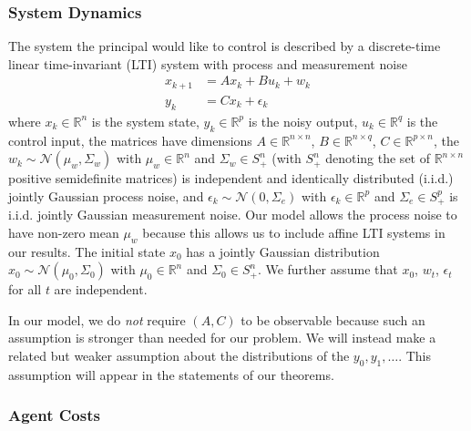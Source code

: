 \documentclass[letterpaper, 10 pt, conference]{ieeeconf}  %
\begin{document}
\subsubsection{System Dynamics}
The system the principal would like to control is described by a discrete-time linear time-invariant (LTI) system with process and measurement noise
\begin{align}
    x_{k+1}&=Ax_{k}+Bu_{k}+w_{k}\\
    y_k &= Cx_k + \epsilon_k
\end{align}
where $x_{k} \in \mathbb{R}^{n}$ is the system state, $y_k \in \mathbb{R}^p$ is the noisy output,  $u_k \in \mathbb{R}^q$ is the control input, the matrices have dimensions $A\in\mathbb{R}^{n\times n}$,  $B\in\mathbb{R}^{n\times q}$, $C\in\mathbb{R}^{p\times n}$, the $w_{k} \sim \mathcal{N}(\mu_{w}, \Sigma_{w})$ with $\mu_w \in \mathbb{R}^n$ and $\Sigma_w \in S^n_+$ (with $S^n_+$ denoting the set of $\mathbb{R}^{n\times n}$ positive semidefinite matrices) is independent and identically distributed (i.i.d.) jointly Gaussian process noise, and $\epsilon_{k} \sim \mathcal{N}(0, \Sigma_{e})$ with $\epsilon_k\in\mathbb{R}^p$ and $\Sigma_e \in S^p_+$ is i.i.d. jointly Gaussian measurement noise. Our model allows the process noise to have non-zero mean $\mu_w$ because this allows us to include affine LTI systems in our results. The initial state $x_0$ has a jointly Gaussian distribution $x_0 \sim \mathcal{N}(\mu_0, \Sigma_{0})$ with $\mu_0 \in \mathbb{R}^n$ and $\Sigma_0 \in S^n_+$. We further assume that $x_0$, $w_t$, $\epsilon_t$ for all $t$ are independent.

In our model, we do \emph{not} require $(A,C)$ to be observable because such an assumption is stronger than needed for our problem. We will instead make a related but weaker assumption about the distributions of the $y_0,y_1,\ldots$. This assumption will appear in the statements of our theorems. 

\subsubsection{Agent Costs}
\end{document}

